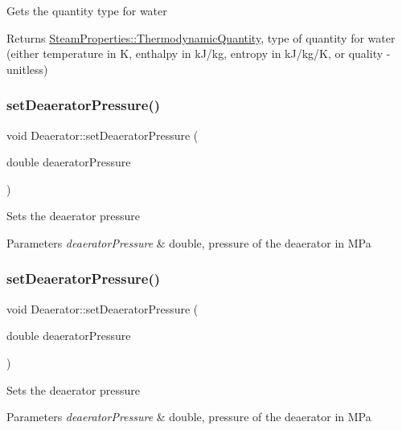 Gets the quantity type for water \begin{DoxyReturn}{Returns}
\hyperlink{class_steam_properties_ae0294bedf7d178c2d8fb6aed0f62fbff}{Steam\+Properties\+::\+Thermodynamic\+Quantity}, type of quantity for water (either temperature in K, enthalpy in k\+J/kg, entropy in k\+J/kg/K, or quality -\/ unitless) 
\end{DoxyReturn}
\mbox{\label{class_deaerator_a5b20d3aba98b21928cce70b45e843ff3}} 
\subsubsection{\texorpdfstring{set\+Deaerator\+Pressure()}{setDeaeratorPressure()}\hspace{0.1cm}{\footnotesize\ttfamily [1/3]}}
{\footnotesize\ttfamily void Deaerator\+::set\+Deaerator\+Pressure (\begin{DoxyParamCaption}\item[{double}]{deaerator\+Pressure }\end{DoxyParamCaption})}

Sets the deaerator pressure 
\begin{DoxyParams}{Parameters}
{\em deaerator\+Pressure} & double, pressure of the deaerator in M\+Pa \\
\hline
\end{DoxyParams}
\mbox{\label{class_deaerator_a5b20d3aba98b21928cce70b45e843ff3}} 
\subsubsection{\texorpdfstring{set\+Deaerator\+Pressure()}{setDeaeratorPressure()}\hspace{0.1cm}{\footnotesize\ttfamily [2/3]}}
{\footnotesize\ttfamily void Deaerator\+::set\+Deaerator\+Pressure (\begin{DoxyParamCaption}\item[{double}]{deaerator\+Pressure }\end{DoxyParamCaption})}

Sets the deaerator pressure 
\begin{DoxyParams}{Parameters}
{\em deaerator\+Pressure} & double, pressure of the deaerator in M\+Pa \\
\hline
\end{DoxyParams}
\mbox{\label{class_deaerator_a5b20d3aba98b21928cce70b45e843ff3}} 
